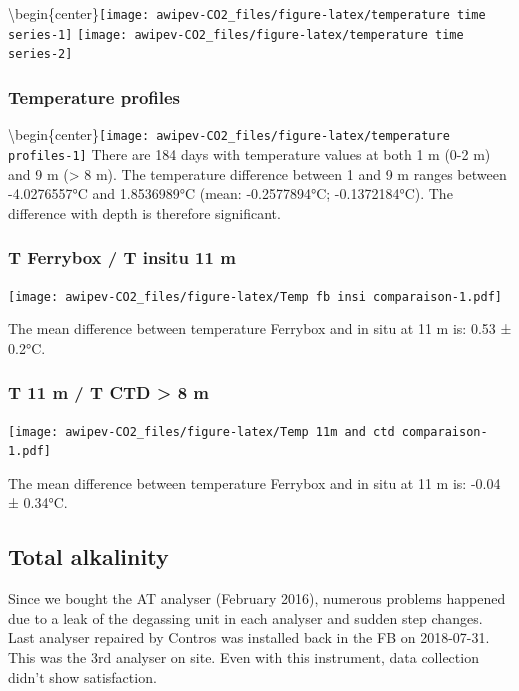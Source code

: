 \documentclass[
]{article}
\begin{document}
\textbackslash begin\{center\}\texttt{[image: awipev-CO2\_files/figure-latex/temperature time series-1]}
\texttt{[image: awipev-CO2\_files/figure-latex/temperature time series-2]}

\hypertarget{temperature-profiles}{%
\subsubsection{\texorpdfstring{\textbf{Temperature
profiles}}{Temperature profiles}}\label{temperature-profiles}}

\textbackslash begin\{center\}\texttt{[image: awipev-CO2\_files/figure-latex/temperature profiles-1]}
There are 184 days with temperature values at both 1 m (0-2 m) and 9 m
(\textgreater{} 8 m). The temperature difference between 1 and 9 m
ranges between -4.0276557°C and 1.8536989°C (mean: -0.2577894°C;
-0.1372184°C). The difference with depth is therefore significant.

\hypertarget{t-ferrybox-t-insitu-11-m}{%
\subsubsection{\texorpdfstring{\textbf{T Ferrybox / T insitu 11 m
}}{T Ferrybox / T insitu 11 m }}\label{t-ferrybox-t-insitu-11-m}}

\texttt{[image: awipev-CO2\_files/figure-latex/Temp fb insi comparaison-1.pdf]}

The mean difference between temperature Ferrybox and in situ at 11 m is:
0.53 ± 0.2°C.

\hypertarget{t-11-m-t-ctd-8-m}{%
\subsubsection{\texorpdfstring{\textbf{T 11 m / T CTD \textgreater{} 8 m
}}{T 11 m / T CTD \textgreater{} 8 m }}\label{t-11-m-t-ctd-8-m}}

\texttt{[image: awipev-CO2\_files/figure-latex/Temp 11m and ctd comparaison-1.pdf]}

The mean difference between temperature Ferrybox and in situ at 11 m is:
-0.04 ± 0.34°C.

\hypertarget{total-alkalinity}{%
\subsection{Total alkalinity}\label{total-alkalinity}}

Since we bought the AT analyser (February 2016), numerous problems
happened due to a leak of the degassing unit in each analyser and sudden
step changes. Last analyser repaired by Contros was installed back in
the FB on 2018-07-31. This was the 3rd analyser on site. Even with this
instrument, data collection didn't show satisfaction.
\end{document}
